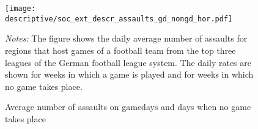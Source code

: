 \vspace*{\fill}
\begin{figure}[H]\centering
	\caption{Average number of assaults on gamedays and days when no game takes place}\label{fig_soc_ext:assaults_across_dows}
	\texttt{[image: descriptive/soc\_ext\_descr\_assaults\_gd\_nongd\_hor.pdf]}
	\scriptsize
	\begin{minipage}{\linewidth}
		\emph{Notes:} The figure shows the daily average number of assaults for regions that host games of a football team from the top three leagues of the German football league system. The daily rates are shown for weeks in which a game is played and for weeks in which no game takes place.
	\end{minipage}
\end{figure}
\vspace*{\fill}\clearpage